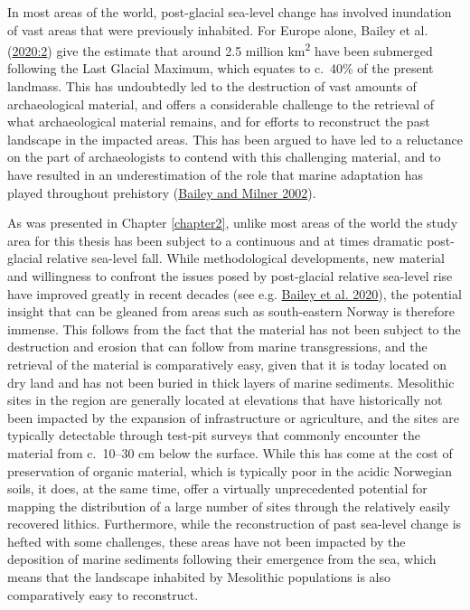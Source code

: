 \documentclass[
  12pt,
  a4paper,
  oneside]{book}
\begin{document}
In most areas of the world, post-glacial sea-level change has involved inundation of vast areas that were previously inhabited. For Europe alone, Bailey et al. (\protect\hyperlink{ref-bailey2020}{2020:2}) give the estimate that around 2.5 million km\textsuperscript{2} have been submerged following the Last Glacial Maximum, which equates to c.~40\% of the present landmass. This has undoubtedly led to the destruction of vast amounts of archaeological material, and offers a considerable challenge to the retrieval of what archaeological material remains, and for efforts to reconstruct the past landscape in the impacted areas. This has been argued to have led to a reluctance on the part of archaeologists to contend with this challenging material, and to have resulted in an underestimation of the role that marine adaptation has played throughout prehistory (\protect\hyperlink{ref-bailey2002}{Bailey and Milner 2002}).

As was presented in Chapter \ref{chapter2}, unlike most areas of the world the study area for this thesis has been subject to a continuous and at times dramatic post-glacial relative sea-level fall. While methodological developments, new material and willingness to confront the issues posed by post-glacial relative sea-level rise have improved greatly in recent decades (see e.g. \protect\hyperlink{ref-bailey2020}{Bailey et al. 2020}), the potential insight that can be gleaned from areas such as south-eastern Norway is therefore immense. This follows from the fact that the material has not been subject to the destruction and erosion that can follow from marine transgressions, and the retrieval of the material is comparatively easy, given that it is today located on dry land and has not been buried in thick layers of marine sediments. Mesolithic sites in the region are generally located at elevations that have historically not been impacted by the expansion of infrastructure or agriculture, and the sites are typically detectable through test-pit surveys that commonly encounter the material from c.~10--30 cm below the surface. While this has come at the cost of preservation of organic material, which is typically poor in the acidic Norwegian soils, it does, at the same time, offer a virtually unprecedented potential for mapping the distribution of a large number of sites through the relatively easily recovered lithics. Furthermore, while the reconstruction of past sea-level change is hefted with some challenges, these areas have not been impacted by the deposition of marine sediments following their emergence from the sea, which means that the landscape inhabited by Mesolithic populations is also comparatively easy to reconstruct.
\end{document}
